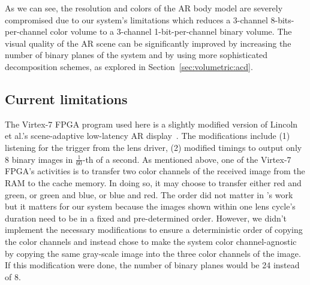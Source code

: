 As we can see, the resolution and colors of the AR body model are severely compromised due to our system's limitations which reduces a 3-channel 8-bits-per-channel color volume to a 3-channel 1-bit-per-channel binary volume.
The visual quality of the AR scene can be significantly improved by increasing the number of binary planes of the system and by using more sophisticated decomposition schemes, as explored in Section~\ref{sec:volumetric:acd}.

\subsection{Current limitations}
\label{sec:volumetric:rts:limitations}
The Virtex-7 FPGA program used here is a slightly modified version of Lincoln et al.'s scene-adaptive low-latency AR display~\cite{Lincoln2017scene}.
The modifications include (1) listening for the trigger from the lens driver, (2) modified timings to output only 8 binary images in $\frac{1}{60}$-th of a second.
As mentioned above, one of the Virtex-7 FPGA's activities is to transfer two color channels of the received image from the RAM to the cache memory.
In doing so, it may choose to transfer either red and green, or green and blue, or blue and red.
The order did not matter in \citet{Lincoln2017scene}'s work but it matters for our system because the images shown within one lens cycle's duration need to be in a fixed and pre-determined order. 
However, we didn't implement the necessary modifications to ensure a deterministic order of copying the color channels and instead chose to make the system color channel-agnostic by copying the same gray-scale image into the three color channels of the image. 
If this modification were done, the number of binary planes would be 24 instead of 8.

